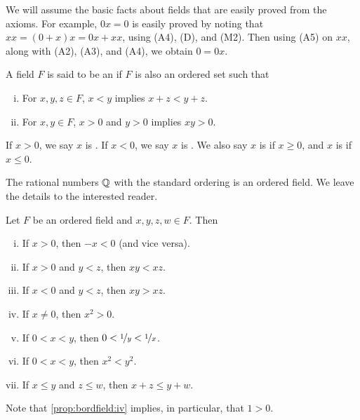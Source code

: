 We will assume the basic facts about fields that are easily
proved from the axioms.  For example, $0x = 0$ is easily proved
by noting that $xx = (0+x)x = 0x+xx$, using (A4), (D)\@, and (M2).  Then
using (A5) on $xx$, along with (A2), (A3), and (A4), we obtain $0 = 0x$.

\begin{defn}
A field $F$ is said to be an \emph{} if
$F$ is also an ordered set such that
\begin{enumerate}[(i)]
\item \label{defn:ordfield:i} For $x,y,z \in F$, $x < y$ implies $x+z <
y+z$.
\item \label{defn:ordfield:ii} For $x,y \in F$, $x > 0$ and $y > 0$
implies $xy > 0$.
\end{enumerate}
If $x > 0$, we say $x$ is \emph{}.
If $x < 0$, we say $x$ is \emph{}.
We also say $x$ is \emph{} if $x \geq 0$,
and $x$ is \emph{} if $x \leq 0$.
\end{defn}

The rational numbers ${\mathbb{Q}}$ with the standard ordering is an ordered field.
We leave the details to the interested reader.

\begin{prop} \label{prop:bordfield}
Let $F$ be an ordered field and $x,y,z,w \in F$.  Then
\begin{enumerate}[(i)]
\item \label{prop:bordfield:i} If $x > 0$, then $-x < 0$ (and vice versa).
\item \label{prop:bordfield:ii} If $x > 0$ and $y < z$, then $xy < xz$.
\item \label{prop:bordfield:iii} If $x < 0$ and $y < z$, then $xy > xz$.
\item \label{prop:bordfield:iv} If $x \neq 0$, then $x^2 > 0$.
\item \label{prop:bordfield:v} If $0 < x < y$, then $0 < \nicefrac{1}{y} < \nicefrac{1}{x}$.
\item \label{prop:bordfield:vi} If $0 < x < y$, then $x^2 < y^2$.
\item \label{prop:bordfield:vii} If $x \leq y$ and $z \leq w$, then $x + z \leq y + w$.
\end{enumerate}
\end{prop}

Note that \ref{prop:bordfield:iv} implies, in particular, that $1 > 0$.

